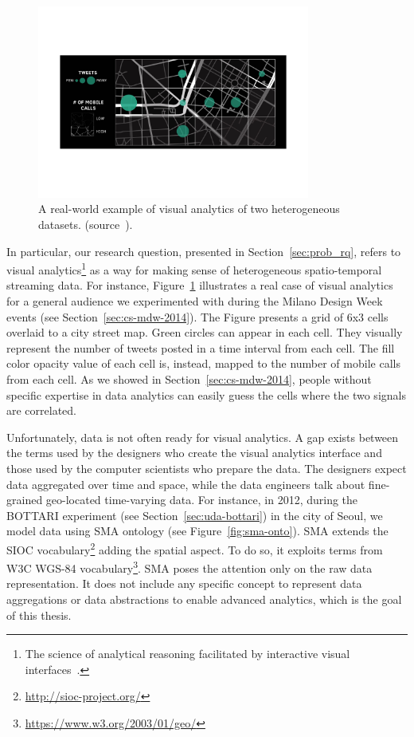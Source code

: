 \begin{figure}[t]
\centering
\includegraphics[width=0.8\textwidth]{img/real-world-rep}
\caption{A real-world example of visual analytics of two heterogeneous datasets. (source~\cite{DBLP:conf/semweb/BalduiniV15}).}
\label{fig:real-world-rep}
\end{figure} 

In particular, our research question, presented in Section~\ref{sec:prob_rq}, refers to visual analytics\footnote{The science of analytical reasoning facilitated by interactive visual interfaces~\cite{cook2005illuminating}.} as a way for making sense of heterogeneous spatio-temporal streaming data.
For instance, Figure~\ref{fig:real-world-rep} illustrates a real case of visual analytics for a general audience we experimented with during the Milano Design Week events (see Section~\ref{sec:cs-mdw-2014}).
The Figure presents a grid of 6x3 cells overlaid to a city street map. Green circles can appear in each cell. They visually represent the number of tweets posted in a time interval from each cell. The fill color opacity value of each cell is, instead, mapped to the number of mobile calls from each cell. As we showed in Section~\ref{sec:cs-mdw-2014}, people without specific expertise in data analytics can easily guess the cells where the two signals are correlated.

Unfortunately, data is not often ready for visual analytics.
A gap exists between the terms used by the designers who create the visual analytics interface and those used by the computer scientists who prepare the data. The designers expect data aggregated over time and space, while the data engineers talk about fine-grained geo-located time-varying data.
For instance, in 2012, during the BOTTARI experiment (see Section~\ref{sec:uda-bottari}) in the city of Seoul, we model data using SMA ontology (see Figure~\ref{fig:sma-onto}).
SMA extends the SIOC vocabulary\footnote{\url{http://sioc-project.org/}} adding the spatial aspect. To do so, it exploits terms from W3C WGS-84 vocabulary\footnote{\url{https://www.w3.org/2003/01/geo/}}.
SMA poses the attention only on the raw data representation.
It does not include any specific concept to represent data aggregations or data abstractions to enable advanced analytics, which is the goal of this thesis.

